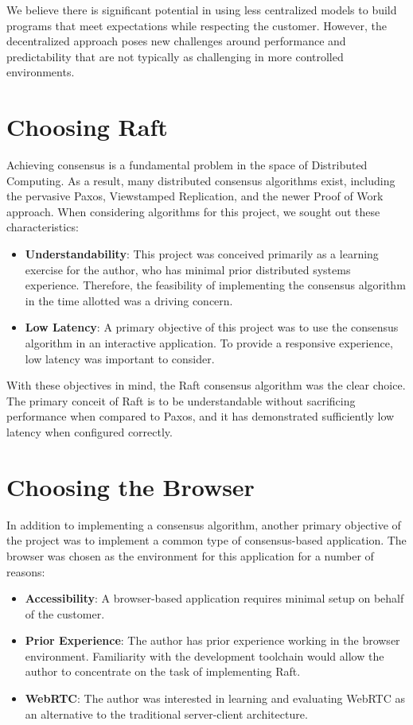 \documentclass[11pt,twocolumn]{article}
\begin{document}
We believe there is significant potential in using less centralized models to build programs that meet expectations while respecting the customer. However, the decentralized approach poses new challenges around performance and predictability that are not typically as challenging in more controlled environments.

\section{Choosing Raft}
Achieving consensus is a fundamental problem in the space of Distributed Computing. As a result, many distributed consensus algorithms exist, including the pervasive Paxos, Viewstamped Replication, and the newer Proof of Work approach. When considering algorithms for this project, we sought out these characteristics:
\begin{itemize}
    \item \textbf{Understandability}: This project was conceived primarily as a learning exercise for the author, who has minimal prior distributed systems experience. Therefore, the feasibility of implementing the consensus algorithm in the time allotted was a driving concern.
    \item \textbf{Low Latency}: A primary objective of this project was to use the consensus algorithm in an interactive application. To provide a responsive experience, low latency was important to consider.
\end{itemize}

With these objectives in mind, the Raft consensus algorithm was the clear choice. The primary conceit of Raft is to be understandable without sacrificing performance when compared to Paxos, and it has demonstrated sufficiently low latency when configured correctly.

\section{Choosing the Browser}
In addition to implementing a consensus algorithm, another primary objective of the project was to implement a common type of consensus-based application. The browser was chosen as the environment for this application for a number of reasons:

\begin{itemize}
    \item \textbf{Accessibility}: A browser-based application requires minimal setup on behalf of the customer.
    \item \textbf{Prior Experience}: The author has prior experience working in the browser environment. Familiarity with the development toolchain would allow the author to concentrate on the task of implementing Raft.
    \item \textbf{WebRTC}: The author was interested in learning and evaluating WebRTC as an alternative to the traditional server-client architecture.

\end{itemize}
\end{document}
